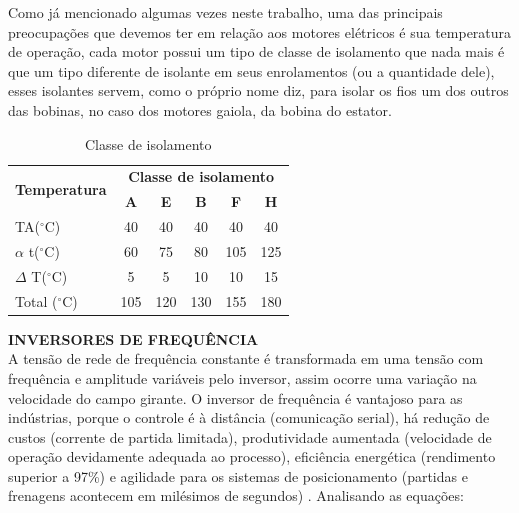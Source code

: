 Como já mencionado algumas vezes neste trabalho, uma das principais preocupações que devemos ter em relação aos motores elétricos é sua temperatura de operação, cada motor possui um tipo de classe de isolamento que nada mais é que um tipo diferente de isolante em seus enrolamentos (ou a quantidade dele), esses isolantes servem, como o próprio nome diz, para isolar os fios um dos outros das bobinas, no caso dos motores gaiola, da bobina do estator.

\begin{table}[]
\centering
\caption{Classe de isolamento}
\label{isolamento}
\begin{tabular}{|l|c|c|c|c|c|}
\hline
\multicolumn{1}{|r|}{\multirow{2}{*}{\textbf{Temperatura}}} & \multicolumn{5}{c|}{\textbf{Classe de isolamento}}             \\ \cline{2-6} 
\multicolumn{1}{|r|}{}                                      & \textbf{A} & \textbf{E} & \textbf{B} & \textbf{F} & \textbf{H} \\ \hline
TA($^{\circ}$C)                                                      & 40         & 40         & 40         & 40         & 40         \\ \hline
$\alpha$ t($^{\circ}$C)                                              & 60         & 75         & 80         & 105        & 125        \\ \hline
$\Delta$ T($^{\circ}$C)                                              & 5          & 5          & 10         & 10         & 15         \\ \hline
Total ($^{\circ}$C)                                                  & 105        & 120        & 130        & 155        & 180        \\ \hline
\end{tabular}
\end{table}

\textbf{INVERSORES DE FREQUÊNCIA}\\

A tensão de rede de frequência constante é transformada em uma tensão com frequência e amplitude variáveis pelo inversor,     assim ocorre uma variação na velocidade do campo girante. O inversor de frequência é vantajoso para as indústrias, porque o controle é à distância (comunicação serial), há redução de custos (corrente de partida limitada), produtividade aumentada (velocidade de operação devidamente adequada ao processo), eficiência energética (rendimento superior a 97\%) e agilidade para os sistemas de posicionamento (partidas e frenagens acontecem em milésimos de segundos) \cite{WEG2}.
    Analisando as equações:
    
